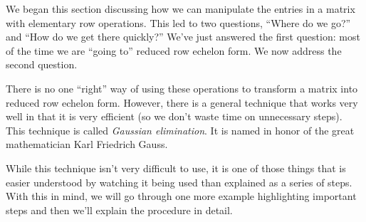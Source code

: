 We began this section discussing how we can manipulate the entries in a matrix with elementary row operations. This led to two questions, ``Where do we go?'' and ``How do we get there quickly?'' We've just answered the first question: most of the time we are ``going to'' reduced row echelon form. We now address the second question.

There is no one ``right'' way of using these operations to transform a matrix into reduced row echelon form. However, there is a general technique that works very well in that it is very efficient (so we don't waste time on unnecessary steps). This technique is called 
\textit{Gaussian elimination}. It is named in honor of the great mathematician Karl Friedrich Gauss.

While this technique isn't very difficult to use, it is one of those things that is easier understood by watching it being used than explained as a series of steps. With this in mind, we will go through one more example highlighting important steps and then we'll explain the procedure in detail.\\

